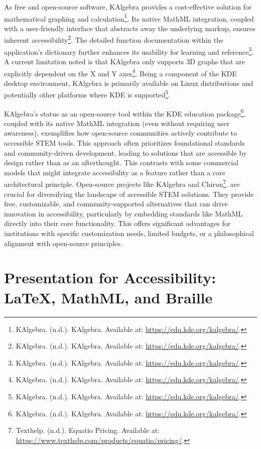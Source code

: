 As free and open-source software, KAlgebra provides a cost-effective solution for mathematical graphing and calculation\footnote{KAlgebra. (n.d.). KAlgebra. Available at: \url{https://edu.kde.org/kalgebra/}.}. Its native MathML integration, coupled with a user-friendly interface that abstracts away the underlying markup, ensures inherent accessibility\footnote{KAlgebra. (n.d.). KAlgebra. Available at: \url{https://edu.kde.org/kalgebra/}.}. The detailed function documentation within the application's dictionary further enhances its usability for learning and reference\footnote{KAlgebra. (n.d.). KAlgebra. Available at: \url{https://edu.kde.org/kalgebra/}.}. A current limitation noted is that KAlgebra only supports 3D graphs that are explicitly dependent on the X and Y axes\footnote{KAlgebra. (n.d.). KAlgebra. Available at: \url{https://edu.kde.org/kalgebra/}.}. Being a component of the KDE desktop environment, KAlgebra is primarily available on Linux distributions and potentially other platforms where KDE is supported\footnote{KAlgebra. (n.d.). KAlgebra. Available at: \url{https://edu.kde.org/kalgebra/}.}.

KAlgebra's status as an open-source tool within the KDE education package\footnote{KAlgebra. (n.d.). KAlgebra. Available at: \url{https://edu.kde.org/kalgebra/}.}, coupled with its native MathML integration (even without requiring user awareness), exemplifies how open-source communities actively contribute to accessible STEM tools. This approach often prioritizes foundational standards and community-driven development, leading to solutions that are accessible by design rather than as an afterthought. This contrasts with some commercial models that might integrate accessibility as a feature rather than a core architectural principle. Open-source projects like KAlgebra and Chirun\footnote{Texthelp. (n.d.). Equatio Pricing. Available at: \url{https://www.texthelp.com/products/equatio/pricing/}.}. are crucial for diversifying the landscape of accessible STEM solutions. They provide free, customizable, and community-supported alternatives that can drive innovation in accessibility, particularly by embedding standards like MathML directly into their core functionality. This offers significant advantages for institutions with specific customization needs, limited budgets, or a philosophical alignment with open-source principles.

\section{Presentation for Accessibility: LaTeX, MathML, and Braille}\label{sec:presentation-accessibility}
